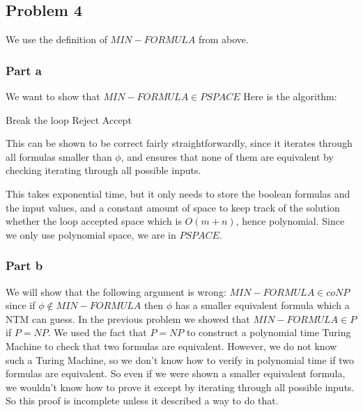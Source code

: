\documentclass[english]{article}
\begin{document}
\subsection*{Problem 4}
We use the definition of $MIN-FORMULA$ from above.
\subsubsection{Part a}
We want to show that $MIN-FORMULA \in PSPACE$
Here is the algorithm:

\begin{algorithmic}
        \State Break the loop
      \EndIf
    \EndFor
      \State Reject
    \EndIf
  \EndFor
  \State Accept
\EndFunction 
\end{algorithmic}

This can be shown to be correct fairly straightforwardly, since it iterates through all formulas smaller than
$\phi$, and ensures that none of them are equivalent by checking iterating through all possible inputs.

This takes exponential time, but it only needs to store the boolean formulas and the input values,
and a constant amount of space to keep track of the solution whether the loop accepted space which is $O(m+n)$,
hence polynomial. Since we only use polynomial space, we are in $PSPACE$.

\subsubsection{Part b}
We will show that the following argument is wrong: $MIN-FORMULA \in coNP$ since if $\phi \notin MIN-FORMULA$ then
$\phi$ has a smaller equivalent formula which a NTM can guess.
In the previous problem we showed that $MIN-FORMULA \in P$ if $P = NP$. We used the fact that $P = NP$ to construct
a polynomial time Turing Machine to check that two formulas are equivalent. However, we do not know such a Turing
Machine, so we don't know how to verify in polynomial time if two formulas are equivalent. So even if we were shown
a smaller equivalent formula, we wouldn't know how to prove it except by iterating through all possible inputs.
So this proof is incomplete unless it described a way to do that.
\end{document}
